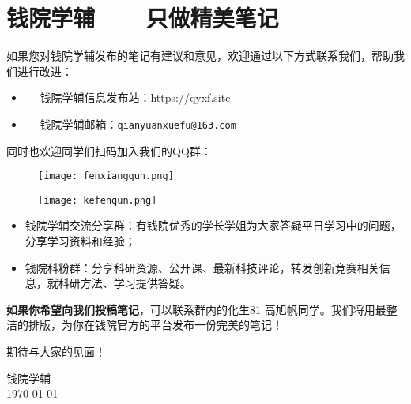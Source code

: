 \newpage
\chapter*{钱院学辅——只做精美笔记}

如果您对钱院学辅发布的笔记有建议和意见，欢迎通过以下方式联系我们，帮助我们进行改进：

\begin{itemize}
	\item \faInternetExplorer ~~ 钱院学辅信息发布站：\url{https://qyxf.site}
	\item \faEnvelopeOpen ~~ 钱院学辅邮箱：\texttt{qianyuanxuefu@163.com}
\end{itemize}

同时也欢迎同学们扫码加入我们的QQ群：

\begin{figure}[!ht]
	\centering
	\begin{minipage}[c]{0.45\textwidth}
		\centering
		\texttt{[image: fenxiangqun.png]}
	\end{minipage}%
	\quad
	\begin{minipage}[c]{0.45\textwidth}
		\centering
		\texttt{[image: kefenqun.png]}
	\end{minipage}
\end{figure}


\begin{itemize}
	\item 钱院学辅交流分享群：有钱院优秀的学长学姐为大家答疑平日学习中的问题，分享学习资料和经验；
	\item 钱院科粉群：分享科研资源、公开课、最新科技评论，转发创新竞赛相关信息，就科研方法、学习提供答疑。
\end{itemize}

\textbf{如果你希望向我们投稿笔记}，可以联系群内的化生81 高旭帆同学。我们将用最整洁的排版，为你在钱院官方的平台发布一份完美的笔记！

期待与大家的见面！

\begin{flushright}
	钱院学辅\\
	\today
\end{flushright}

